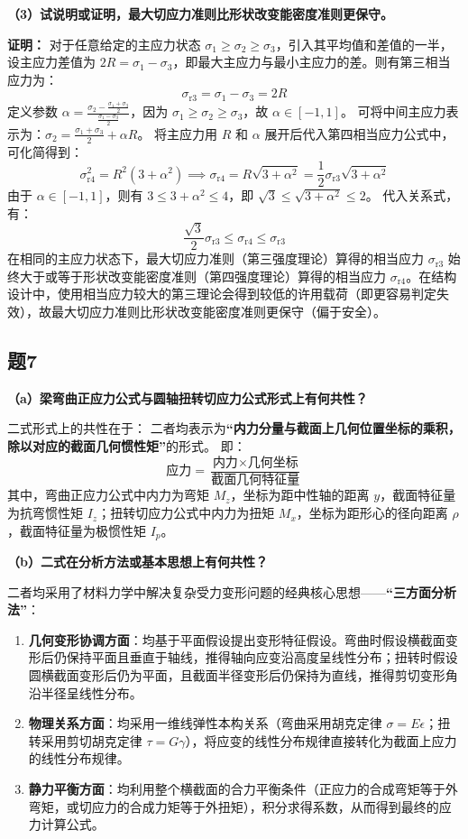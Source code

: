 \documentclass[11pt,a4paper]{ctexrep}
\begin{document}
{\textbf{（3）试说明或证明，最大切应力准则比形状改变能密度准则更保守。}

\textbf{证明：}
对于任意给定的主应力状态 $\sigma_1 \ge \sigma_2 \ge \sigma_3$，引入其平均值和差值的一半，设主应力差值为 $2R = \sigma_1 - \sigma_3$，即最大主应力与最小主应力的差。则有第三相当应力为：
\[
    \sigma_{\text{r3}} = \sigma_1 - \sigma_3 = 2R
\]
定义参数 $\alpha = \frac{\sigma_2 - \frac{\sigma_1 + \sigma_3}{2}}{\frac{\sigma_1 - \sigma_3}{2}}$，因为 $\sigma_1 \ge \sigma_2 \ge \sigma_3$，故 $\alpha \in [-1, 1]$。
可将中间主应力表示为：$\sigma_2 = \frac{\sigma_1 + \sigma_3}{2} + \alpha R$。
将主应力用 $R$ 和 $\alpha$ 展开后代入第四相当应力公式中，可化简得到：
\[
    \sigma_{\text{r4}}^2 = R^2 (3 + \alpha^2) \implies \sigma_{\text{r4}} = R\sqrt{3 + \alpha^2} = \frac{1}{2}\sigma_{\text{r3}}\sqrt{3+\alpha^2}
\]
由于 $\alpha \in [-1, 1]$，则有 $3 \le 3 + \alpha^2 \le 4$，即 $\sqrt{3} \le \sqrt{3 + \alpha^2} \le 2$。
代入关系式，有：
\[
    \frac{\sqrt{3}}{2} \sigma_{\text{r3}} \le \sigma_{\text{r4}} \le \sigma_{\text{r3}}
\]
在相同的主应力状态下，最大切应力准则（第三强度理论）算得的相当应力 $\sigma_{\text{r3}}$ 始终大于或等于形状改变能密度准则（第四强度理论）算得的相当应力 $\sigma_{\text{r4}}$。在结构设计中，使用相当应力较大的第三理论会得到较低的许用载荷（即更容易判定失效），故最大切应力准则比形状改变能密度准则更保守（偏于安全）。

\subsection*{题7}
\textbf{（a）梁弯曲正应力公式与圆轴扭转切应力公式形式上有何共性？}

二式形式上的共性在于：
二者均表示为\textbf{“内力分量与截面上几何位置坐标的乘积，除以对应的截面几何惯性矩”}的形式。
即：
\[
    \text{应力} = \frac{\text{内力} \times \text{几何坐标}}{\text{截面几何特征量}}
\]
其中，弯曲正应力公式中内力为弯矩 $M_z$，坐标为距中性轴的距离 $y$，截面特征量为抗弯惯性矩 $I_z$；扭转切应力公式中内力为扭矩 $M_x$，坐标为距形心的径向距离 $\rho$，截面特征量为极惯性矩 $I_p$。

\textbf{（b）二式在分析方法或基本思想上有何共性？}

二者均采用了材料力学中解决复杂受力变形问题的经典核心思想——\textbf{“三方面分析法”}：
\begin{enumerate}
    \item \textbf{几何变形协调方面}：均基于平面假设提出变形特征假设。弯曲时假设横截面变形后仍保持平面且垂直于轴线，推得轴向应变沿高度呈线性分布；扭转时假设圆横截面变形后仍为平面，且截面半径变形后仍保持为直线，推得剪切变形角沿半径呈线性分布。
    \item \textbf{物理关系方面}：均采用一维线弹性本构关系（弯曲采用胡克定律 $\sigma = E \epsilon$；扭转采用剪切胡克定律 $\tau = G \gamma$），将应变的线性分布规律直接转化为截面上应力的线性分布规律。
    \item \textbf{静力平衡方面}：均利用整个横截面的合力平衡条件（正应力的合成弯矩等于外弯矩，或切应力的合成力矩等于外扭矩），积分求得系数，从而得到最终的应力计算公式。
\end{enumerate}

}
\end{document}
